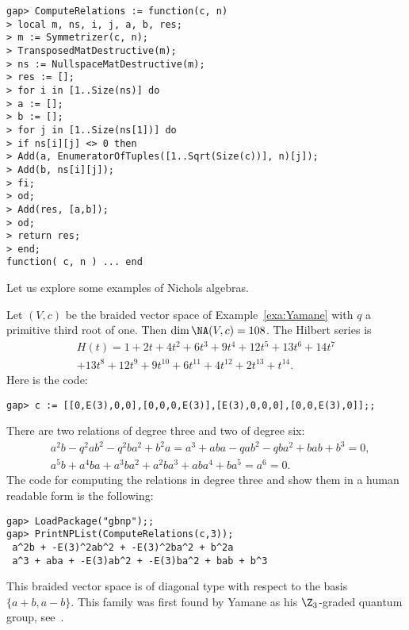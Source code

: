 \begin{lstlisting}
gap> ComputeRelations := function(c, n)
> local m, ns, i, j, a, b, res;
> m := Symmetrizer(c, n);
> TransposedMatDestructive(m);
> ns := NullspaceMatDestructive(m);
> res := [];
> for i in [1..Size(ns)] do
> a := [];
> b := [];
> for j in [1..Size(ns[1])] do
> if ns[i][j] <> 0 then
> Add(a, EnumeratorOfTuples([1..Sqrt(Size(c))], n)[j]);
> Add(b, ns[i][j]);
> fi;
> od;
> Add(res, [a,b]);
> od;
> return res;
> end;
function( c, n ) ... end
\end{lstlisting}

Let us explore some examples of Nichols algebras. 

\begin{example}[Yamane]
Let $(V,c)$ be the braided vector space of Example~\ref{exa:Yamane} with $q$ a
primitive third root of one. 
Then $\dim\NA(V,c)=108$. The Hilbert series is
\begin{multline*}
H(t)=1+2t+ 4t^2+ 6t^3+ 9t^4+ 12t^5+ 13t^6
+ 14t^7\\+ 13t^8+ 12t^9+ 9t^{10}+ 6t^{11}+ 4t^{12}+ 2t^{13}+t^{14}.
\end{multline*}
Here is the code:
\begin{lstlisting}
gap> c := [[0,E(3),0,0],[0,0,0,E(3)],[E(3),0,0,0],[0,0,E(3),0]];;

\end{lstlisting}
There are two relations of degree three and two of degree six:
\begin{align*}
&a^2b -q^2ab^2 -q^2ba^2 + b^2a=
a^3 + aba -qab^2 -qba^2 + bab + b^3=0,\\
&a^5b + a^4ba + a^3ba^2 + a^2ba^3 + aba^4 + ba^5=
a^6=0.
\end{align*}
The code for computing the relations in degree three and show them in a human
readable form is the following:
\begin{lstlisting}
gap> LoadPackage("gbnp");;
gap> PrintNPList(ComputeRelations(c,3));
 a^2b + -E(3)^2ab^2 + -E(3)^2ba^2 + b^2a 
 a^3 + aba + -E(3)ab^2 + -E(3)ba^2 + bab + b^3 
\end{lstlisting}
This braided vector space is of diagonal type with respect to the basis
$\{a+b,a-b\}$. %
This family was first found by Yamane as his $\Z_3$-graded quantum group,
see~\cite{MR2317113}.
\end{example}

